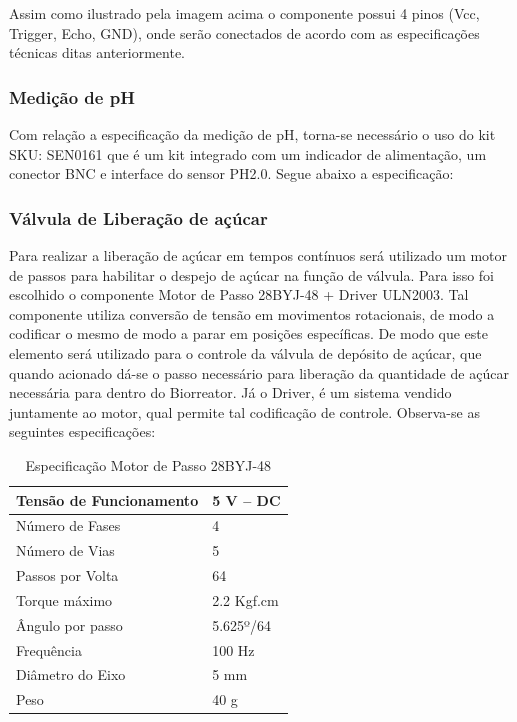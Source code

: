 Assim como ilustrado pela imagem acima o componente possui 4 pinos (Vcc, Trigger, Echo, GND), onde serão conectados de acordo com as especificações técnicas ditas anteriormente.

\subsubsection{Medição de pH}

Com relação a especificação da medição de pH, torna-se necessário o uso do kit SKU: SEN0161 que é um kit integrado com um indicador de alimentação, um conector BNC e interface do sensor PH2.0. Segue abaixo a especificação:

\subsubsection{Válvula de Liberação de açúcar}

Para realizar a liberação de açúcar em tempos contínuos será utilizado um motor de passos para habilitar o despejo de açúcar na função de válvula. Para isso foi escolhido o componente Motor de Passo 28BYJ-48 + Driver ULN2003. Tal componente utiliza conversão de tensão em movimentos rotacionais, de modo a codificar o mesmo de modo a parar em posições específicas. De modo que este elemento será utilizado para o controle da válvula de depósito de açúcar, que quando acionado dá-se o passo necessário para liberação da quantidade de açúcar necessária para dentro do Biorreator. Já o Driver, é um sistema vendido juntamente ao motor, qual permite tal codificação de controle. Observa-se as seguintes especificações:

\begin{table}[h]
\centering
\caption{Especificação Motor de Passo 28BYJ-48}
\label{table3}
\begin{tabular}{|l|l|}
\hline
Tensão de Funcionamento & 5 V – DC   \\ \hline
Número de Fases         & 4          \\ \hline
Número de Vias          & 5          \\ \hline
Passos por Volta        & 64         \\ \hline
Torque máximo           & 2.2 Kgf.cm \\ \hline
Ângulo por passo        & 5.625º/64  \\ \hline
Frequência              & 100 Hz     \\ \hline
Diâmetro do Eixo        & 5 mm       \\ \hline
Peso                    & 40 g       \\ \hline
\end{tabular}
\end{table}

